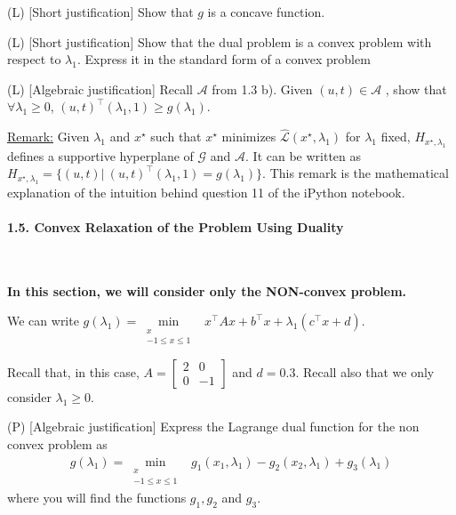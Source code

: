 \begin{enumerate}
    \setcounter{enumi}{7}
    \qitem (L) [Short justification] Show that $g$ is a concave function.
    
    \sol{}
    
    \qitem (L) [Short justification] Show that the dual problem is a convex problem with respect to $\lambda_1$. Express it in the standard form of a convex problem
    
    \sol{}
    
    \qitem (L) [Algebraic justification] Recall $\mathcal{A}$ from 1.3 b). Given $(u,t)\in\mathcal{A}$ , show that $\forall \lambda_1 \geq 0$, $(u,t)^\top(\lambda_1, 1)\geq g(\lambda_1)$.
    
    \sol{}
    
    \underline{Remark:} Given $\lambda_1$ and $x^\star$ such that $x^\star$ minimizes $\hat{\mathcal{L}}(x^\star,\lambda_1)$ for $\lambda_1$ fixed, $H_{x^\star,\lambda_1}$ defines a supportive hyperplane of $\mathcal{G}$ and $\mathcal{A}$. 
    It can be written as $H_{x^\star,\lambda_1}=\{(u,t)|\ (u,t)^\top(\lambda_1, 1) = g(\lambda_1)\}$. 
    This remark is the mathematical explanation of the intuition behind question 11 of the iPython notebook.
\end{enumerate}

\paragraph{1.5. Convex Relaxation of the Problem Using Duality}\

\textbf{In this section, we will consider only the NON-convex problem.}

We can write $g(\lambda_1) = \min\limits_{\substack{x \\ -1\leq x \leq 1}}\;\;x^\top A x + b^\top x + \lambda_1(c^\top x + d)$.

Recall that, in this case,  $A = \begin{bmatrix} 2 & 0 \\ 0 & -1 \end{bmatrix}$ and $d=0.3$.
Recall also that we only consider $\lambda_1 \geq 0$.

\begin{enumerate}
    \qitem (P) [Algebraic justification] Express the Lagrange dual function for the non convex problem as
    \begin{align*}
        g(\lambda_1) = \min_{\substack{x \\ -1\leq x \leq 1}}\;\;g_1(x_1,\lambda_1) - g_2(x_2,\lambda_1) + g_3(\lambda_1)
    \end{align*}
    where you will find the functions $g_1,g_2$ and $g_3$.
    
    \sol{}
\end{enumerate}

